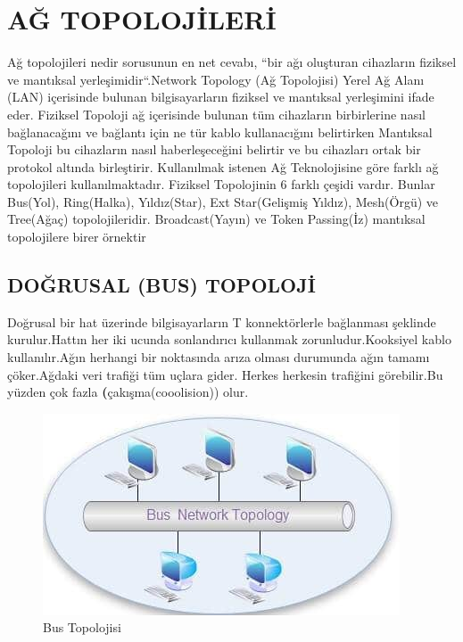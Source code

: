 \section*{AĞ TOPOLOJİLERİ }
Ağ topolojileri nedir sorusunun en net cevabı, “bir ağı oluşturan cihazların fiziksel ve mantıksal yerleşimidir“.Network Topology (Ağ Topolojisi) Yerel Ağ Alanı (LAN) içerisinde bulunan bilgisayarların fiziksel ve mantıksal yerleşimini ifade eder. Fiziksel Topoloji ağ içerisinde bulunan tüm cihazların birbirlerine nasıl bağlanacağını ve bağlantı için ne tür kablo kullanacığını belirtirken Mantıksal Topoloji bu cihazların nasıl haberleşeceğini belirtir ve bu cihazları ortak bir protokol altında birleştirir. Kullanılmak istenen Ağ Teknolojisine göre farklı ağ topolojileri kullanılmaktadır.
Fiziksel Topolojinin 6 farklı çeşidi vardır. Bunlar Bus(Yol), Ring(Halka), Yıldız(Star), Ext Star(Gelişmiş Yıldız), Mesh(Örgü) ve Tree(Ağaç) topolojileridir. Broadcast(Yayın) ve Token Passing(İz) mantıksal topolojilere birer örnektir 

\subsection*{DOĞRUSAL (BUS) TOPOLOJİ}
Doğrusal bir hat üzerinde bilgisayarların T konnektörlerle bağlanması şeklinde kurulur.Hattın her iki ucunda 
sonlandırıcı kullanmak zorunludur.Kooksiyel kablo kullanılır.Ağın herhangi  bir noktasında arıza olması durumunda ağın tamamı çöker.Ağdaki veri trafiği tüm uçlara gider.
Herkes herkesin trafiğini görebilir.Bu yüzden çok fazla \textbf(çakışma(cooolision)) olur.
\begin{figure}[!ht]
    \includegraphics{images/bus-topolojisi}
   \caption{Bus Topolojisi}
   \label{fig:bustopolojisi}
 \end{figure}

